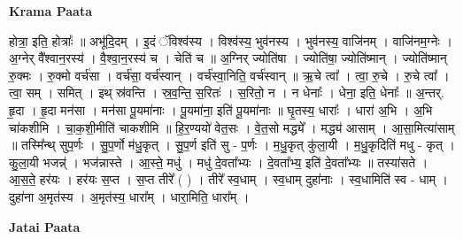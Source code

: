 \documentclass[17pt]{extarticle}
\begin{document}
\textbf{Krama Paata} \newline

होत्रा॒ इति॒ होत्राः᳚ ॥ अभू॑दि॒दम् । इ॒दं ॅविश्व॑स्य । विश्व॑स्य॒ भुव॑नस्य । भुव॑नस्य॒ वाजि॑नम् । वाजि॑नम॒ग्नेः । अ॒ग्नेर् वै᳚श्वान॒रस्य॑ । वै॒श्वा॒न॒रस्य॑ च । चेति॑ च ॥ अ॒ग्निर् ज्योति॑षा । ज्योति॑षा॒ ज्योति॑ष्मान् । ज्योति॑ष्मान् रु॒क्मः । रु॒क्मो वर्च॑सा । वर्च॑सा॒ वर्च॑स्वान् । वर्च॑स्वा॒निति॒ वर्च॑स्वान् ॥ ऋ॒चे त्वा᳚ । त्वा॒ रु॒चे । रु॒चे त्वा᳚ । त्वा॒ सम् । समित् । इथ् स्र॑वन्ति । स्र॒व॒न्ति॒ स॒रितः॑ । स॒रितो॒ न । न धेनाः᳚ । धेना॒ इति॒ धेनाः᳚ ॥ अ॒न्तर्. हृ॒दा । हृ॒दा मन॑सा । मन॑सा पू॒यमा॑नाः । पू॒यमा॑ना॒ इति॑ पू॒यमा॑नाः ॥ घृ॒तस्य॒ धाराः᳚ । धारा॑ अ॒भि । अ॒भि चा॑कशीमि । चा॒क॒शी॒मीति॑ चाकशीमि ॥ हि॒र॒ण्ययो॑ वेत॒सः । वे॒त॒सो मद्ध्ये᳚ । मद्ध्य॑ आसाम् । आ॒सा॒मित्या॑साम् ॥ तस्मि᳚न्थ् सुप॒र्णः । सु॒प॒र्णो म॑धु॒कृत् । सु॒प॒र्ण इति॑ सु - प॒र्णः । म॒धु॒कृत् कु॑ला॒यी । म॒धु॒कृदिति॑ मधु - कृत् । कु॒ला॒यी भजन्न्॑ । भज॑न्नास्ते । आ॒स्ते॒ मधु॑ । मधु॑ दे॒वता᳚भ्यः । दे॒वता᳚भ्य॒ इति॑ दे॒वता᳚भ्यः ॥ तस्या॑सते । आ॒स॒ते॒ हर॑यः । हर॑यः स॒प्त । स॒प्त तीरे᳚ ( ) । तीरे᳚ स्व॒धाम् । स्व॒धाम् दुहा॑नाः । स्व॒धामिति॑ स्व - धाम् । दुहा॑ना अ॒मृत॑स्य । अ॒मृत॑स्य॒ धारा᳚म् । धारा॒मिति॒ धारा᳚म् । \newline

\textbf{Jatai Paata} \newline
\end{document}
